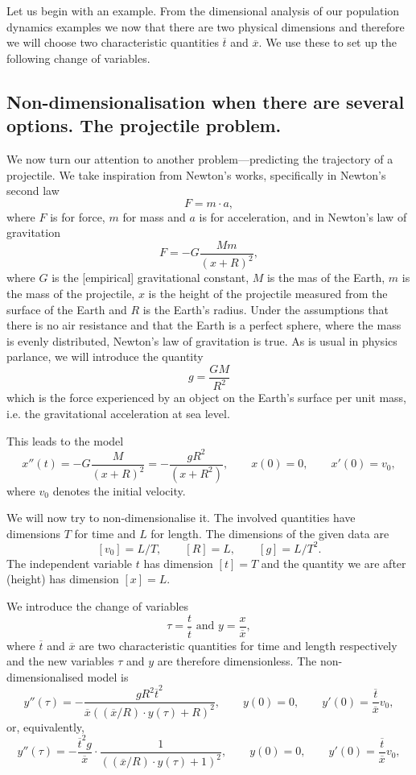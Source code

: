 Let us begin with an example. From the dimensional analysis of our population
dynamics examples we now that there are two physical dimensions and therefore
we will choose two characteristic quantities $\overline{t}$ and $\overline{x}$.
We use these to set up the following change of variables.


\subsection{Non-dimensionalisation when there are several options. The
projectile problem.}

We now turn our attention to another problem---predicting the trajectory of a
projectile. We take inspiration from Newton's works, specifically in Newton's
second law
\[
 F = m \cdot a,
\]
where $F$ is for force, $m$ for mass and $a$ is for acceleration, and in
Newton's law of gravitation
\[
  F = - G \frac{M m}{(x + R)^2},
\]
where $G$ is the [empirical] gravitational constant, $M$ is the mas of the
Earth, $m$ is the mass of the projectile, $x$ is the height of the projectile
measured from the surface of the Earth and $R$ is the Earth's radius. Under the
assumptions that there is no air resistance and that the Earth is a perfect
sphere, where the mass is evenly distributed, Newton's law of gravitation is
true. As is usual in physics parlance, we will introduce the quantity
\[
  g = \frac{G M}{R^2}
\]
which is the force experienced by an object on the Earth's surface per unit
mass, i.e. the gravitational acceleration at sea level.

This leads to the model
\[
  x''(t) = -G \frac{M}{(x + R)^2} = - \frac{g R^2}{(x + R^2)},\qquad
  x(0) = 0,\qquad
  x'(0) = v_0,
\]
where $v_0$ denotes the initial velocity.

We will now try to non-dimensionalise it. The involved quantities have
dimensions $T$ for time and $L$ for length. The dimensions of the given data
are
\[
  [v_0] = L / T,\qquad [R] = L,\qquad [g] = L / T^2.
\]
The independent variable $t$ has dimension $[t] = T$ and the quantity we are
after (height) has dimension $[x] = L$.

We introduce the change of variables
\[
  \tau = \frac{t}{\overline{t}} \text{ and } y = \frac{x}{\overline{x}},
\]
where $\overline{t}$ and $\overline{x}$ are two characteristic quantities for
time and length respectively and the new variables $\tau$ and $y$ are therefore
dimensionless. The non-dimensionalised model is
\[
  y''(\tau) = - \frac{gR^2 \overline{t}^2}{\overline{x}((\overline{x}/R) \cdot y(\tau) + R)^2}, \qquad
  y(0) = 0, \qquad
  y'(0) = \frac{\overline{t}}{\overline{x}} v_0,
\]
or, equivalently,
\[
  y''(\tau) = - \frac{\overline{t}^2 g}{\overline{x}} \cdot \frac{1}{((\overline{x}/R)\cdot y(\tau) + 1)^2},\qquad
  y(0) = 0, \qquad
  y'(0) = \frac{\overline{t}}{\overline{x}} v_0,
\]


